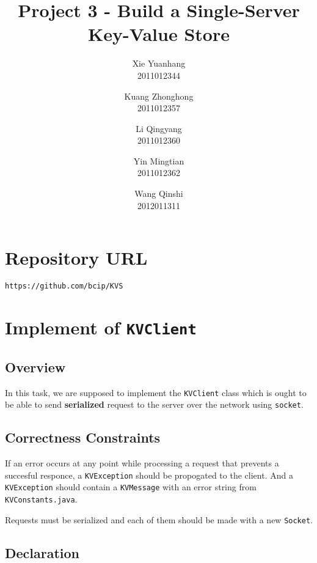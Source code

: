 \documentclass{article}
\title{Project 3 - Build a Single-Server Key-Value Store}
\author{
Xie Yuanhang  \\   2011012344\and
Kuang Zhonghong  \\   2011012357\and
Li Qingyang   \\   2011012360 \and
Yin Mingtian   \\   2011012362\and
Wang Qinshi   \\   2012011311}
\date{}
\begin{document}
\maketitle

\setcounter{section}{-1}
 \section{Repository URL}
\texttt{https://github.com/bcip/KVS}

\section{Implement of \texttt{KVClient}}
\subsection{Overview}
In this task, we are supposed to implement the \texttt{KVClient} class which is ought to be able to send \textbf{serialized} request to the server
over the network using \texttt{socket}.
\subsection{Correctness Constraints}
\begin{compactitem}
\item If an error occurs at any point while processing a request that prevents a succesful responce, a \texttt{KVException} should be propogated 
	to the client. And a \texttt{KVException} should contain a \texttt{KVMessage} with an error string from \texttt{KVConstants.java}.
\item Requests must be serialized and each of them should be made with a new \texttt{Socket}.
\end{compactitem}
\subsection{Declaration}
\end{document}
